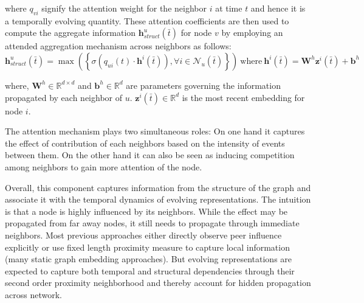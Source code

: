 \documentclass[11pt]{article}
\begin{document}
where $q_{vi}$ signify the attention weight for the neighbor $i$ at time $t$ and hence it is a temporally evolving quantity. These attention coefficients are 
then used to compute the aggregate information $\mathbf{h}_{struct}^u(\bar{t})$ for node $v$ by employing an attended aggregation mechanism across neighbors as follows: 
\vspace{-1mm}
\begin{equation*}\label{struct}
\mathbf{h}_{struct}^u(\bar{t}) = \max\left(\left\{\sigma\left(q_{ui}(t) \cdot\mathbf{h}^i(\bar{t})\right),\forall i \in  \mathcal{N}_u(\bar{t}) \right\}\right)~\text{where}~\mathbf{h}^i(\bar{t}) = \mathbf{W}^{h}\mathbf{z}^i(\bar{t}) + \mathbf{b}^{h}
\end{equation*}

where, $\mathbf{W}^{h} \in \mathbb{R}^{d \times d}$ and $\mathbf{b}^{h} \in \mathbb{R}^{d}$ are parameters governing the information propagated by each neighbor of $u$. $\mathbf{z}^i(\bar{t}) \in \mathbb{R}^d$ is the most recent embedding for node $i$. 

The attention mechanism plays two simultaneous roles: On one hand it captures the effect of contribution of each neighbors based on the intensity of events between them. On the other hand it can also be seen as inducing competition among neighbors to gain more attention of the node. 

Overall, this component captures information from the structure of the graph and associate it with the temporal dynamics of evolving representations. The intuition is that a node is highly influenced by its neighbors. While the effect may be propagated from far away nodes, it still needs to propagate through immediate neighbors. Most previous approaches either directly observe peer influence explicitly or use fixed length proximity measure to capture local information (many static graph embedding approaches). But evolving representations are expected to capture both temporal and structural dependencies through their second order proximity neighborhood and thereby account for hidden propagation across network. 
\end{document}
